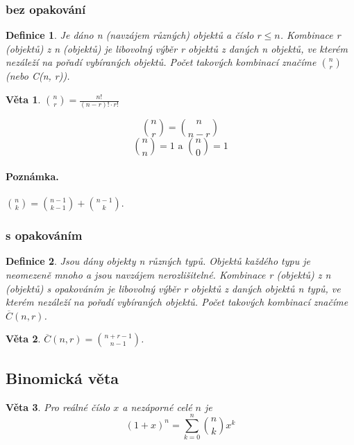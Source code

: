 \documentclass[12pt,a4paper]{article}
\newtheorem{definition}{Definice}
\newtheorem{sentence}{Věta}
\begin{document}
\subsubsection{bez opakování}
\begin{definition}
	Je dáno n (navzájem různých) objektů a číslo $r \leq n$. Kombinace r (objektů) z n (objektů) je libovolný výběr r objektů z daných n objektů, ve kterém nezáleží na pořadí vybíraných objektů. Počet takových kombinací značíme $n \choose r$ (nebo C(n, r)).
\end{definition}
\begin{sentence}
	${n \choose r} = \frac{n!}{(n - r)! \cdot r!}$
\end{sentence}
$$ {n \choose r} = {n \choose n - r} $$
$${n \choose n} = 1 \text{ a } {n \choose 0} = 1 $$
\paragraph{Poznámka.} ${n \choose k} = {n - 1 \choose k - 1} + {n - 1 \choose k}$.

\subsubsection{s opakováním}
\begin{definition}
	Jsou dány objekty n různých typů. Objektů každého typu je neomezeně mnoho a jsou navzájem nerozlišitelné. Kombinace r (objektů) z n (objektů) s opakováním je libovolný výběr r objektů z daných objektů n typů, ve kterém nezáleží na pořadí vybíraných objektů. Počet takových kombinací značíme $\overline{C}(n, r)$.
\end{definition}
\begin{sentence}
	$\overline{C}(n, r) = {n + r - 1 \choose n - 1}$.
\end{sentence}

\subsection{Binomická věta}
\begin{sentence}
Pro reálné číslo $x$ a nezáporné celé $n$ je $$(1 + x)^n = \sum\limits_{k=0}^n {n \choose k} x^k $$
\end{sentence}
\end{document}
